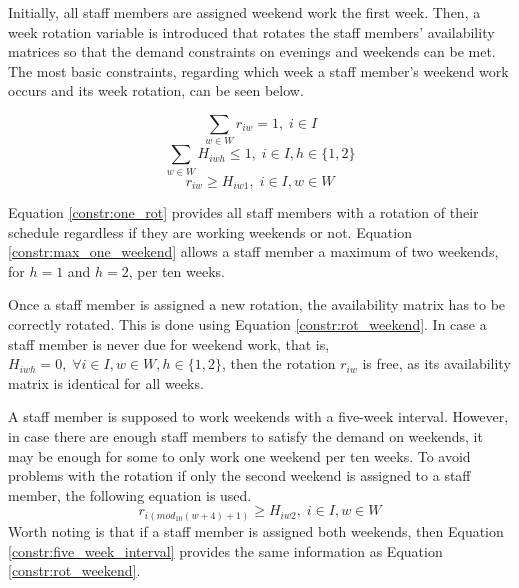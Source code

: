 Initially, all staff members are assigned weekend work the first week. Then, a week rotation variable is introduced that rotates the staff members' availability matrices so that the demand constraints on evenings and weekends can be met. The most basic constraints, regarding which week a staff member's weekend work occurs and its week rotation, can be seen below.

\begin{equation} \label{constr:one_rot}
\sum_{w \in W} r_{iw} = 1, \;   i\in I
\end{equation}
\begin{equation} \label{constr:max_one_weekend}
\sum_{w \in W} H_{iwh} \leq 1, \;   i\in I, h \in \{1,2\}
\end{equation}
\begin{equation} \label{constr:rot_weekend}
r_{iw} \geq H_{iw1}, \;   i\in I, w \in W
\end{equation}

Equation \ref{constr:one_rot} provides all staff members with a rotation of their schedule regardless if they are working weekends or not. Equation \ref{constr:max_one_weekend} allows a staff member a maximum of two weekends, for $h=1$ and $h=2$, per ten weeks.

Once a staff member is assigned a new rotation, the availability matrix has to be correctly rotated. This is done using Equation \ref{constr:rot_weekend}. In case a staff member is never due for weekend work, that is, $H_{iwh} = 0, \; \forall i\in I, w \in W, h \in \{1,2\}$, then the rotation $r_{iw}$ is free, as its availability matrix is identical for all weeks. 

A staff member is supposed to work weekends with a five-week interval. However, in case there are enough staff members to satisfy the demand on weekends, it may be enough for some to only work one weekend per ten weeks. To avoid problems with the rotation if only the second weekend is assigned to a staff member, the following equation is used.
\begin{equation} \label{constr:five_week_interval}
r_{i(mod_{10}(w+4)+1)} \geq H_{iw2}, \;   i\in I, w \in W
\end{equation}
Worth noting is that if a staff member is assigned both weekends, then Equation \ref{constr:five_week_interval} provides the same information as Equation \ref{constr:rot_weekend}.


